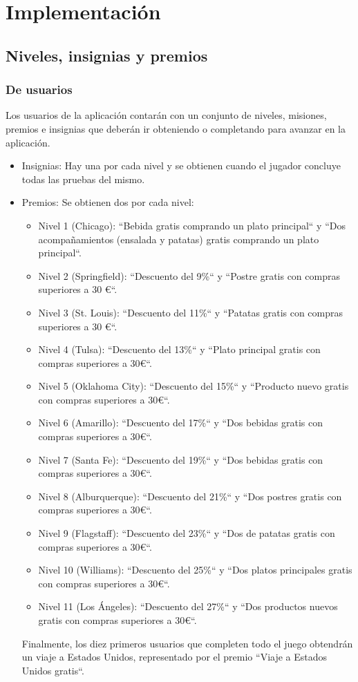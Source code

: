 \documentclass[twoside]{report}
\begin{document}
\section{Implementación}

\subsection{Niveles, insignias y premios}

\subsubsection{De usuarios}

Los usuarios de la aplicación contarán con un conjunto de niveles, misiones, premios e insignias que deberán ir obteniendo o completando para avanzar en la aplicación. 

\begin{itemize}
\item Insignias: Hay una por cada nivel y se obtienen cuando el jugador concluye todas las pruebas del mismo.
\item Premios: Se obtienen dos por cada nivel:
	\begin{itemize}
	\item Nivel 1 (Chicago): “Bebida gratis comprando un plato principal“ y “Dos acompañamientos (ensalada y patatas) gratis comprando un plato principal“.
	\item Nivel 2 (Springfield): “Descuento del 9\%“ y “Postre gratis con compras superiores a 30 \euro“.
	\item Nivel 3 (St. Louis): “Descuento del 11\%“ y “Patatas gratis con compras superiores a 30 \euro“.
	\item Nivel 4 (Tulsa): “Descuento del 13\%“ y “Plato principal gratis con compras superiores a 30\euro“.
	\item Nivel 5 (Oklahoma City): “Descuento del 15\%“ y “Producto nuevo gratis con compras superiores a 30\euro“.
	\item Nivel 6 (Amarillo): “Descuento del 17\%“ y “Dos bebidas gratis con compras superiores a 30\euro“.
	\item Nivel 7 (Santa Fe): “Descuento del 19\%“ y “Dos bebidas gratis con compras superiores a 30\euro“.
	\item Nivel 8 (Alburquerque): “Descuento del 21\%“ y “Dos postres gratis con compras superiores a 30\euro“.
	\item Nivel 9 (Flagstaff): “Descuento del 23\%“ y “Dos de patatas gratis con compras superiores a 30\euro“.
	\item Nivel 10 (Williams): “Descuento del 25\%“ y “Dos platos principales gratis con compras superiores a 30\euro“.
	\item Nivel 11 (Los Ángeles): “Descuento del 27\%“ y “Dos productos nuevos gratis con compras superiores a 30\euro“.
	\end{itemize}
	Finalmente, los diez primeros usuarios que completen todo el juego obtendrán un viaje a Estados Unidos, representado por el premio “Viaje a Estados Unidos gratis“.
\end{itemize}
\end{document}
